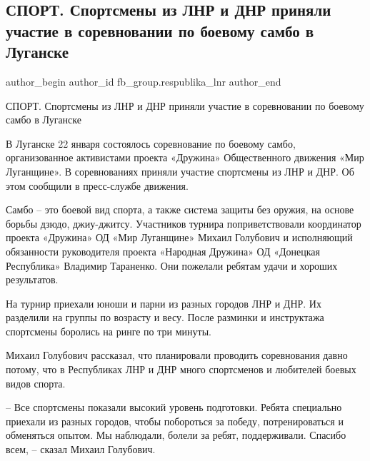  
 
 
 
 
 
\subsection{СПОРТ. Спортсмены из ЛНР и ДНР приняли участие в соревновании по боевому самбо в Луганске}
\label{sec:23_01_2022.fb.fb_group.respublika_lnr.1.sorev_sambo_lugansk}
 
\ifcmt
 author_begin
   author_id fb_group.respublika_lnr
 author_end
\fi

СПОРТ. Спортсмены из ЛНР и ДНР приняли участие в соревновании по боевому самбо
в Луганске

В Луганске 22 января состоялось соревнование по боевому самбо, организованное
активистами проекта «Дружина» Общественного движения «Мир Луганщине». В
соревнованиях приняли участие спортсмены из ЛНР и ДНР. Об этом сообщили в
пресс-службе движения.


Самбо –  это боевой вид спорта, а также система защиты без оружия, на основе
борьбы дзюдо, джиу-джитсу. Участников турнира поприветствовали координатор
проекта «Дружина» ОД «Мир Луганщине» Михаил Голубович и исполняющий обязанности
руководителя проекта «Народная Дружина» ОД «Донецкая Республика» Владимир
Тараненко. Они пожелали ребятам удачи и хороших результатов.

На турнир приехали юноши и парни из разных городов ЛНР и ДНР. Их разделили на
группы по возрасту и весу. После разминки и инструктажа спортсмены боролись на
ринге по три минуты.

Михаил Голубович рассказал, что планировали проводить соревнования давно
потому, что в Республиках ЛНР и ДНР много спортсменов и любителей боевых видов
спорта.

– Все спортсмены показали высокий уровень подготовки. Ребята специально
приехали из разных городов, чтобы побороться за победу, потренироваться и
обменяться опытом. Мы наблюдали, болели за ребят, поддерживали. Спасибо всем, –
сказал Михаил Голубович.

